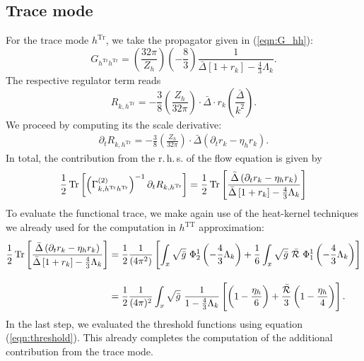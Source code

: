 \subsection{Trace mode}
For the trace mode $h^{\mathrm{Tr}}$, we take the propagator given in (\ref{eqn:G_hh}):
\begin{equation}
	G_{h^{\mathrm{Tr}}h^{\mathrm{Tr}}} =\left(\frac{32\pi}{Z_h}\right) \left(-\frac{8}{3}\right)\frac{1}{\bar{\Delta}\left[1+r_k\right] - \frac{4}{3}\Lambda_k}.
\end{equation}
The respective regulator term reads
\begin{equation}
	R_{k,h^{\mathrm{Tr}}} = -\frac{3}{8}\left(\frac{Z_h}{32\pi}\right)\cdot\bar{\Delta}\cdot r_k\left(\frac{\bar{\Delta}}{k^2}\right).
\end{equation}
We proceed by computing its the scale derivative:
\begin{align}
	\partial_t R_{k,h^{\mathrm{Tr}}} = -\frac{3}{8}\left(\frac{Z_h}{32\pi}\right)\cdot\bar{\Delta}\left(\partial_tr_k - \eta_h r_k\right).
\end{align}
In total, the contribution from the r.\,h.\,s. of the flow equation is given by 
\begin{equation}
	\begin{aligned}
	\frac{1}{2}\operatorname{Tr}\left[ \left(\Gamma^{(2)}_{k, h^{\mathrm{Tr}} h^{\mathrm{Tr}}}\right)^{-1}\partial_t R_{k, h^{\mathrm{Tr}}} \right] =
		\frac{1}{2}\operatorname{Tr}\left[ \frac{\bar{\Delta}\left(\partial_tr_k - \eta_h r_k\right)}{\bar{\Delta}\left[1+r_k\right] - \frac{4}{3}\Lambda_k} \right]
	\end{aligned}
\end{equation}
To evaluate the functional trace, we make again use of the heat-kernel techniques we already used for the computation in $h^{\mathrm{TT}}$ approximation:
\begin{equation}
\begin{aligned}
\frac{1}{2}\tr{\frac{\bar{\Delta}\left(\partial_tr_k - \eta_h r_k\right)}{\bar{\Delta}\left[1+r_k\right] - \frac{4}{3}\Lambda_k}} &= \frac{1}{2} \frac{1}{\left(4 \pi^{2}\right)}\left[\int_{x} \sqrt{\bar{g}}\ \Phi_{2}^{1}\left(-\frac{4}{3}\Lambda_k\right)+\frac{1}{6} \int_{x} \sqrt{\bar{g}} \ \bar{\mathcal{R}} \ \Phi_{1}^{1}\left(-\frac{4}{3}\Lambda_k\right)\right] \\[10pt]
&= 	\frac{1}{2}\frac{1}{(4\pi)^2}\int_x\sqrt{\bar{g}}\ \frac{1}{1-\frac{4}{3}\Lambda_k}\left[\left(1-\frac{\eta_h}{6}\right) + \frac{\bar{\mathcal{R}}}{3}\left(1-\frac{\eta_h}{4}\right)\right].
	\end{aligned}
\end{equation}
In the last step, we evaluated the threshold functions using equation (\ref{eqn:threshold}). This already completes the computation of the additional contribution from the trace mode.  
